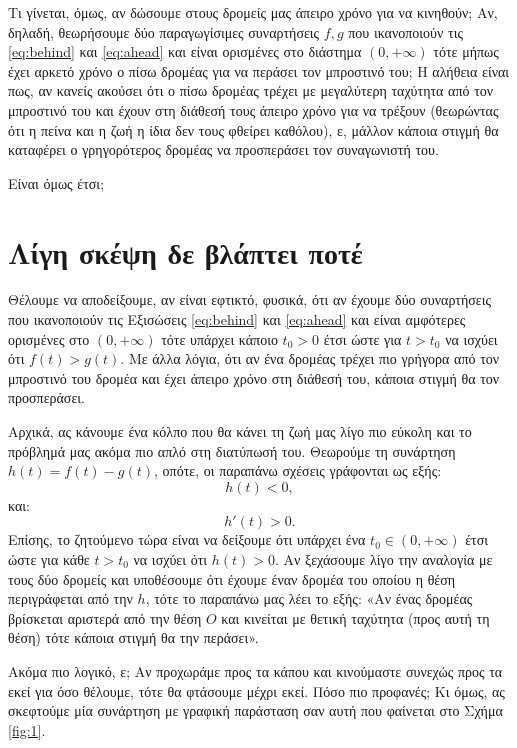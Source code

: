 \documentclass[11pt,a4paper]{article}
\theoremstyle{definition}
\begin{document}
	Τι γίνεται, όμως, αν δώσουμε στους δρομείς μας άπειρο χρόνο για να κινηθούν; Αν, δηλαδή, θεωρήσουμε δύο παραγωγίσιμες συναρτήσεις $f,g$ που ικανοποιούν τις \eqref{eq:behind} και \eqref{eq:ahead} και είναι ορισμένες στο διάστημα $(0,+\infty)$ τότε μήπως έχει αρκετό χρόνο ο πίσω δρομέας για να περάσει τον μπροστινό του; Η αλήθεια είναι πως, αν κανείς ακούσει ότι ο πίσω δρομέας τρέχει με μεγαλύτερη ταχύτητα από τον μπροστινό του και έχουν στη διάθεσή τους άπειρο χρόνο για να τρέξουν (θεωρώντας ότι η πείνα και η ζωή η ίδια δεν τους φθείρει καθόλου), ε, μάλλον κάποια στιγμή θα καταφέρει ο γρηγορότερος δρομέας να προσπεράσει τον συναγωνιστή του.
	
	Είναι όμως έτσι;
	
	\section{Λίγη σκέψη δε βλάπτει ποτέ}
	Θέλουμε να αποδείξουμε, αν είναι εφτικτό, φυσικά, ότι αν έχουμε δύο συναρτήσεις που ικανοποιούν τις Εξισώσεις \eqref{eq:behind} και \eqref{eq:ahead} και είναι αμφότερες ορισμένες στο $(0,+\infty)$ τότε υπάρχει κάποιο $t_0>0$ έτσι ώστε για $t>t_0$ να ισχύει ότι $f(t)>g(t)$. Με άλλα λόγια, ότι αν ένα δρομέας τρέχει πιο γρήγορα από τον μπροστινό του δρομέα και έχει άπειρο χρόνο στη διάθεσή του, κάποια στιγμή θα τον προσπεράσει.
	
	Αρχικά, ας κάνουμε ένα κόλπο που θα κάνει τη ζωή μας λίγο πιο εύκολη και το πρόβλημά μας ακόμα πιο απλό στη διατύπωσή του. Θεωρούμε τη συνάρτηση $h(t)=f(t)-g(t)$, οπότε, οι παραπάνω σχέσεις γράφονται ως εξής:
	\begin{equation}\label{eq:h_behind}
	h(t)<0,
	\end{equation}
	και:
	\begin{equation}\label{eq:h_ahead}
	h'(t)>0.
	\end{equation}
	Επίσης, το ζητούμενο τώρα είναι να δείξουμε ότι υπάρχει ένα $t_0\in(0,+\infty)$ έτσι ώστε για κάθε $t>t_0$ να ισχύει ότι $h(t)>0$. Αν ξεχάσουμε λίγο την αναλογία με τους δύο δρομείς και υποθέσουμε ότι έχουμε έναν δρομέα του οποίου η θέση περιγράφεται από την $h$, τότε το παραπάνω μας λέει το εξής: «Αν ένας δρομέας βρίσκεται αριστερά από την θέση $O$ και κινείται με θετική ταχύτητα (προς αυτή τη θέση) τότε κάποια στιγμή θα την περάσει».
	
	Ακόμα πιο λογικό, ε; Αν προχωράμε προς τα κάπου και κινούμαστε συνεχώς προς τα εκεί για όσο θέλουμε, τότε θα φτάσουμε μέχρι εκεί. Πόσο πιο προφανές; Κι όμως, ας σκεφτούμε μία συνάρτηση με γραφική παράσταση σαν αυτή που φαίνεται στο Σχήμα \ref{fig:1}.
	
\end{document}
